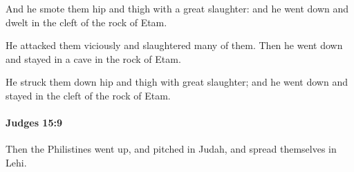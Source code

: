 			\begin{versebox}
					\item[BHS] 
					\item[ASV] And he smote them hip and thigh with a great slaughter: and he went down and dwelt in the cleft of the rock of Etam.
					\item[NIV] He attacked them viciously and slaughtered many of them. Then he went down and stayed in a cave in the rock of Etam.
					\item[NRSV] He struck them down hip and thigh with great slaughter; and he went down and stayed in the cleft of the rock of Etam.
			\end{versebox}

		\paragraph{Judges 15:9} %
			\label{JUDGES-15-9}

			Then the Philistines went up, and pitched in Judah, and spread themselves in Lehi.

